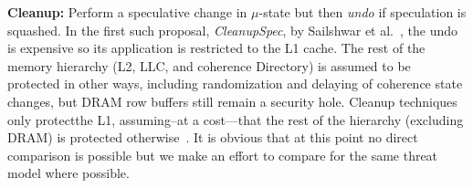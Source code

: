 \item{\textbf{Cleanup:}} Perform a speculative change in $\mu$-state but then \emph{undo} if speculation is squashed. In the first such proposal, \emph{CleanupSpec}, by Sailshwar et al.~\cite{saileshwar2019cleanupspec}, the undo is expensive so its application is restricted to the L1 cache. The rest of the memory hierarchy (L2, LLC, and coherence Directory) is assumed to be protected in other ways, including randomization and delaying of coherence state changes, but DRAM row buffers still remain a security hole.
Cleanup techniques only protectthe L1, assuming--at a cost---that the rest of the hierarchy (excluding DRAM) is protected otherwise~\cite{saileshwar2019cleanupspec}. 
\squishend
{\color{red} It is obvious that at this point no direct comparison is possible but we make an effort to compare for the same threat model where possible.}



